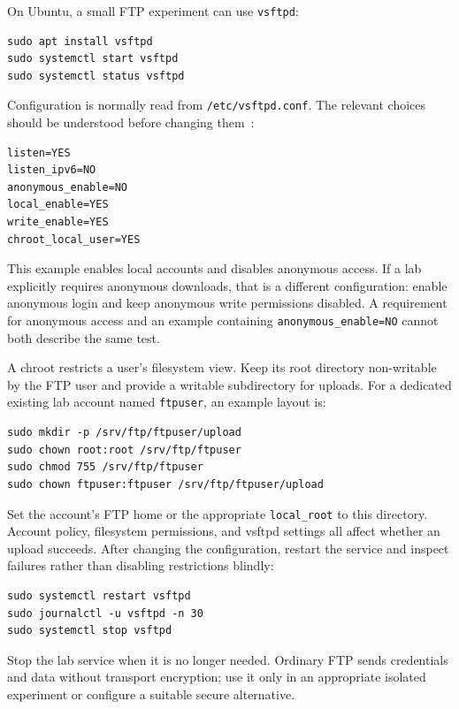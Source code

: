 \documentclass[journal]{IEEEtran}
\begin{document}
On Ubuntu, a small FTP experiment can use \texttt{vsftpd}:
\begin{lstlisting}
sudo apt install vsftpd
sudo systemctl start vsftpd
sudo systemctl status vsftpd
\end{lstlisting}
Configuration is normally read from \texttt{/etc/vsftpd.conf}. The relevant choices should be understood before changing them~\cite{vsftpd}:
\begin{lstlisting}
listen=YES
listen_ipv6=NO
anonymous_enable=NO
local_enable=YES
write_enable=YES
chroot_local_user=YES
\end{lstlisting}
This example enables local accounts and disables anonymous access. If a lab explicitly requires anonymous downloads, that is a different configuration: enable anonymous login and keep anonymous write permissions disabled. A requirement for anonymous access and an example containing \texttt{anonymous\_enable=NO} cannot both describe the same test.

A chroot restricts a user's filesystem view. Keep its root directory non-writable by the FTP user and provide a writable subdirectory for uploads. For a dedicated existing lab account named \texttt{ftpuser}, an example layout is:
\begin{lstlisting}
sudo mkdir -p /srv/ftp/ftpuser/upload
sudo chown root:root /srv/ftp/ftpuser
sudo chmod 755 /srv/ftp/ftpuser
sudo chown ftpuser:ftpuser /srv/ftp/ftpuser/upload
\end{lstlisting}
Set the account's FTP home or the appropriate \texttt{local\_root} to this directory. Account policy, filesystem permissions, and vsftpd settings all affect whether an upload succeeds. After changing the configuration, restart the service and inspect failures rather than disabling restrictions blindly:
\begin{lstlisting}
sudo systemctl restart vsftpd
sudo journalctl -u vsftpd -n 30
sudo systemctl stop vsftpd
\end{lstlisting}
Stop the lab service when it is no longer needed. Ordinary FTP sends credentials and data without transport encryption; use it only in an appropriate isolated experiment or configure a suitable secure alternative.
\end{document}
